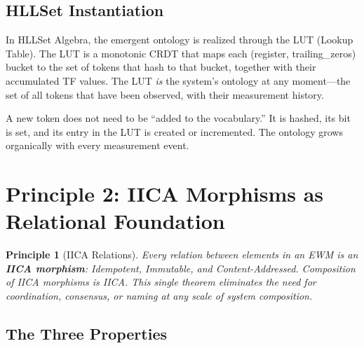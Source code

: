 \documentclass[11pt,a4paper]{article}
\newtheorem{principle}{Principle}[section]
\theoremstyle{remark}
\begin{document}
\subsection{HLLSet Instantiation}

In HLLSet Algebra, the emergent ontology is realized through the LUT (Lookup Table).
The LUT is a monotonic CRDT that maps each (register, trailing\_zeros) bucket to the
set of tokens that hash to that bucket, together with their accumulated TF values. The
LUT \textit{is} the system's ontology at any moment---the set of all tokens that have
been observed, with their measurement history.

A new token does not need to be ``added to the vocabulary.'' It is hashed, its bit is
set, and its entry in the LUT is created or incremented. The ontology grows
organically with every measurement event.

\section{Principle 2: IICA Morphisms as Relational Foundation}
\label{sec:iica}

\begin{principle}[IICA Relations]
\label{prin:iica}
Every relation between elements in an EWM is an \textbf{IICA morphism}: Idempotent,
Immutable, and Content-Addressed. Composition of IICA morphisms is IICA. This single
theorem eliminates the need for coordination, consensus, or naming at any scale of
system composition.
\end{principle}

\subsection{The Three Properties}
\end{document}
